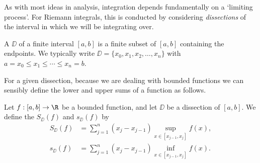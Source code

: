 \documentclass[a4paper]{scrartcl}
\begin{document}
As with most ideas in analysis, integration depends fundamentally on a `limiting process'. For Riemann integrals, this is conducted by considering \emph{dissections} of the interval in which we will be integrating over.

\begin{definition}[Dissection]
	A  $\DD$ of a finite interval $[a, b]$ is a finite subset of $[a, b]$ containing the endpoints. We typically write $\DD = \{x_0, x_1, x_2, \dots, x_n\}$ with $a = x_0 \leq x_1 \leq \cdots \leq x_n = b$.
\end{definition}

For a given dissection, because we are dealing with bounded functions we can sensibly define the lower and upper sums of a function as follows.

\begin{definition}
	Let $f: [a, b] \rightarrow \R$ be a bounded function, and let $\DD$ be a dissection of $[a, b]$. We define the  $S_{\DD}(f)$ and  $s_{\DD}(f)$ by
	\begin{align*}
		S_{\DD}(f) &= \sum_{j = 1}^n (x_j - x_{j - 1}) \sup_{x \in [x_{j - 1}, x_j]} f(x), \\
		s_{\DD}(f) &= \sum_{j = 1}^n (x_j - x_{j - 1}) \inf_{x \in [x_{j - 1}, x_j]} f(x).
	\end{align*}
\end{definition}


\end{document}
